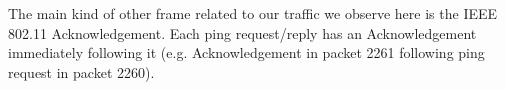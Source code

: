 The main kind of other frame related to our traffic we observe here is the IEEE 802.11 Acknowledgement. Each ping request/reply has an Acknowledgement immediately following it (e.g. Acknowledgement in packet 2261 following ping request in packet 2260).


%
%
%
